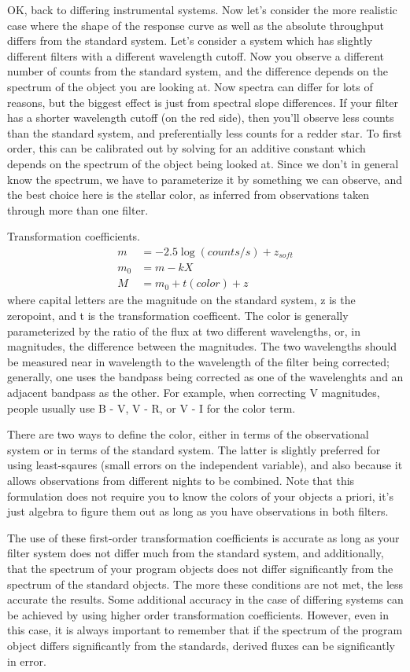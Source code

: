 \documentclass[12pt]{article}
\begin{document}
OK, back to differing instrumental systems. Now let's consider the
more realistic case where the shape of the response curve as well as
the absolute throughput differs from the standard system. Let's
consider a system which has slightly different filters with a
different wavelength cutoff. Now you observe a different number of
counts from the standard system, and the difference depends on the
spectrum of the object you are looking at. Now spectra can differ for
lots of reasons, but the biggest effect is just from spectral slope
differences. If your filter has a shorter wavelength cutoff (on the
red side), then you'll observe less counts than the standard system,
and preferentially less counts for a redder star. To first order, this
can be calibrated out by solving for an additive constant which
depends on the spectrum of the object being looked at. Since we don't
in general know the spectrum, we have to parameterize it by something
we can observe, and the best choice here is the stellar color, as
inferred from observations taken through more than one filter.

Transformation coefficients.
\begin{align*}
    m &= -2.5\log(counts/s) + z_{soft}\\
    m_{0} &= m - kX\\
    M &= m_{0} + t(color) + z
\end{align*}
where capital letters are the magnitude on the standard system, z is
the zeropoint, and t is the transformation coefficent.
The color is generally parameterized by the ratio of the flux at two
different wavelengths, or, in magnitudes, the difference between the
magnitudes. The two wavelengths should be measured near in wavelength
to the wavelength of the filter being corrected; generally, one uses
the bandpass being corrected as one of the wavelenghts and an adjacent
bandpass as the other. For example, when correcting V magnitudes,
people usually use B - V, V - R, or V - I for the color term.

There are two ways to define the color, either in terms of the
observational system or in terms of the standard system. The latter is
slightly preferred for using least-sqaures (small errors on the
independent variable), and also because it allows observations from
different nights to be combined. Note that this formulation does not
require you to know the colors of your objects a priori, it's just
algebra to figure them out as long as you have observations in both
filters.

The use of these first-order transformation coefficients is accurate
as long as your filter system does not differ much from the standard
system, and additionally, that the spectrum of your program objects
does not differ significantly from the spectrum of the standard
objects. The more these conditions are not met, the less accurate the
results. Some additional accuracy in the case of differing systems can
be achieved by using higher order transformation coefficients.
However, even in this case, it is always important to remember that if
the spectrum of the program object differs significantly from the
standards, derived fluxes can be significantly in error.
\end{document}
